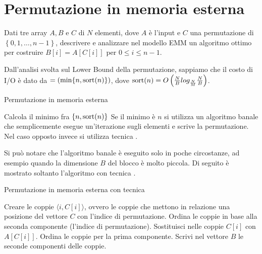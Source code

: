 \chapter{Permutazione in memoria esterna}

\begin{problem*}
    Dati tre array \(A, B\) e \(C\) di \(N\) elementi, dove \(A\) \`e l'input e 
    \(C\) una permutazione di \(\left\{0,1,\dots ,n-1\right\}\), descrivere e
    analizzare nel modello EMM un algoritmo ottimo per costruire
    \(B[i]=A[C[i]]\) per \(0\le i\le n-1\).
\end{problem*}

Dall'analisi svolta sul Lower Bound della permutazione, sappiamo che il costo di
I/O è dato da \(=(\min\{n, \mbox{sort}(n)\})\), dove \(\mbox{sort}(n) =
O\left(\frac{N}{B}log_\frac{N}{M} \frac{N}{B}\right)\).
 
\begin{algorithm}
    \caption{Permutazione in memoria esterna}
    \begin{algorithmic}[1]
        \State Calcola il minimo fra \(\{n, \mbox{sort}(n)\}\)
        \State Se il minimo è \(n\) si utilizza un algoritmo banale che semplicemente esegue un'iterazione sugli elementi e scrive la permutazione.
        \State Nel caso opposto invece si utilizza tecnica \mapreduce.
    \end{algorithmic}	
\end{algorithm}

Si può notare che l'algoritmo banale è eseguito solo in poche circostanze,
ad esempio quando la dimensione \(B\) del blocco è molto piccola. Di seguito
è mostrato soltanto l'algoritmo con tecnica \mapreduce.
 
\begin{algorithm}
    \caption{Permutazione in memoria esterna con tecnica \mapreduce}
    \begin{algorithmic}[1]
        \State Creare le coppie \(\langle i,C[i] \rangle\), ovvero le coppie che mettono in relazione una posizione del vettore \(C\) con l'indice di permutazione.
        \State Ordina le coppie in base alla seconda componente (l'indice di permutazione).
        \State Sostituisci nelle coppie \(C[i]\) con \(A[C[i]]\).
        \State Ordina le coppie per la prima componente.
        \State Scrivi nel vettore \(B\) le seconde componenti delle coppie.
    \end{algorithmic}	
\end{algorithm}

